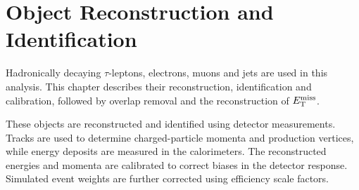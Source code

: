 \chapter{Object Reconstruction and Identification}
\label{chapter:object_reconstruction}

Hadronically decaying $\tau$-leptons, electrons, muons and jets are used in this analysis.
This chapter describes their reconstruction, identification and calibration, followed by overlap removal and the reconstruction of $E_{\mathrm{T}}^{\mathrm{miss}}$.

These objects are reconstructed and identified using detector measurements.
Tracks are used to determine charged-particle momenta and production vertices, while energy deposits are measured in the calorimeters.
The reconstructed energies and momenta are calibrated to correct biases in the detector response.
Simulated event weights are further corrected using efficiency scale factors.











